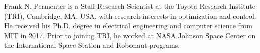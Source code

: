 \begin{IEEEbiography}{Frank
N. Permenter} is a Staff Research Scientist at the Toyota Research Institute
(TRI), Cambridge, MA, USA, with research interests in optimization and control.
He received his Ph.D. degree in electrical engineering and computer science from
MIT in 2017. Prior to joining TRI, he worked at NASA Johnson Space Center on the
International Space Station and Robonaut programs.
\end{IEEEbiography}
